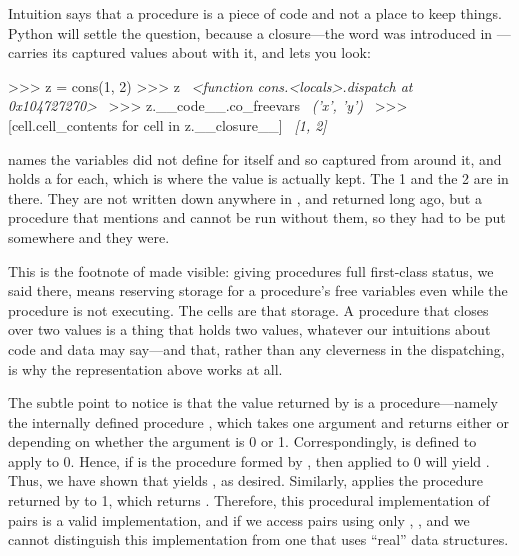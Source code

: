 \begin{revealTheSurface}
Intuition says that a procedure is a piece of code and not a place to keep
things.  Python will settle the question, because a closure---the word was
introduced in ---carries its captured values about with it,
and lets you look:

\begin{codeBlock}
>>> z = cons(1, 2)
>>> z
~\textit{<function cons.<locals>.dispatch at 0x104727270>}~
>>> z.__code__.co_freevars
~\textit{('x', 'y')}~
>>> [cell.cell_contents for cell in z.__closure__]
~\textit{[1, 2]}~
\end{codeBlock}

\noindent
{} names the variables  did not define for
itself and so captured from around it, and  holds a
 for each, which is where the value is actually kept.  The 1 and
the 2 are in there.  They are not written down anywhere in , and
 returned long ago, but a procedure that mentions  and
 cannot be run without them, so they had to be put somewhere and they
were.

This is the footnote of  made visible: giving procedures
full first-class status, we said there, means reserving storage for a
procedure's free variables even while the procedure is not executing.  The
cells are that storage.  A procedure that closes over two values is a thing
that holds two values, whatever our intuitions about code and data may
say---and that, rather than any cleverness in the dispatching, is why the
representation above works at all.
\end{revealTheSurface}

The subtle point to notice is that the value returned by  is a
procedure---namely the internally defined procedure , which
takes one argument and returns either  or  depending on whether
the argument is 0 or 1.  Correspondingly,  is defined to apply
 to 0.  Hence, if  is the procedure formed by
, then  applied to 0 will yield .  Thus, we
have shown that  yields , as desired.  Similarly,
 applies the procedure returned by  to
1, which returns .  Therefore, this procedural implementation of pairs
is a valid implementation, and if we access pairs using only ,
, and  we cannot distinguish this implementation from one
that uses ``real'' data structures.

